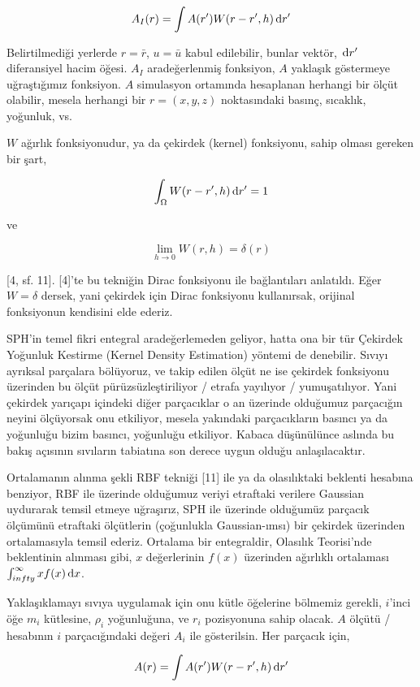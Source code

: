 \documentclass[12pt,fleqn]{article}\usepackage{../../common}
\begin{document}
$$
A_I(r) = \int A(r') W(r-r',h) \,\mathrm{d} r'
$$

Belirtilmediği yerlerde $r = \bar{r}$, $u = \bar{u}$ kabul edilebilir, bunlar
vektör, $\,\mathrm{d} r'$ diferansiyel hacim öğesi. $A_I$ aradeğerlenmiş fonksiyon, $A$
yaklaşık göstermeye uğraştığımız fonksiyon. $A$ simulasyon ortamında hesaplanan
herhangi bir ölçüt olabilir, mesela herhangi bir $r=(x,y,z)$ noktasındaki
basınç, sıcaklık, yoğunluk, vs.

$W$ ağırlık fonksiyonudur, ya da çekirdek (kernel) fonksiyonu, sahip olması
gereken bir şart,

$$
\int_\Omega  W(r-r',h) \,\mathrm{d} r' = 1
$$

ve

$$
\lim_{h \to 0} W(r,h) = \delta(r)
$$

[4, sf. 11]. [4]'te bu tekniğin Dirac fonksiyonu ile bağlantıları
anlatıldı. Eğer $W = \delta$ dersek, yani çekirdek için Dirac fonksiyonu
kullanırsak, orijinal fonksiyonun kendisini elde ederiz.

SPH'in temel fikri entegral aradeğerlemeden geliyor, hatta ona bir tür Çekirdek
Yoğunluk Kestirme (Kernel Density Estimation) yöntemi de denebilir. Sıvıyı
ayrıksal parçalara bölüyoruz, ve takip edilen ölçüt ne ise çekirdek fonksiyonu
üzerinden bu ölçüt pürüzsüzleştiriliyor / etrafa yayılıyor / yumuşatılıyor. Yani
çekirdek yarıçapı içindeki diğer parçacıklar o an üzerinde olduğumuz parçacığın
neyini ölçüyorsak onu etkiliyor, mesela yakındaki parçacıkların basıncı ya da
yoğunluğu bizim basıncı, yoğunluğu etkiliyor. Kabaca düşünülünce aslında bu
bakış açısının sıvıların tabiatına son derece uygun olduğu anlaşılacaktır.

Ortalamanın alınma şekli RBF tekniği [11] ile ya da olasılıktaki beklenti
hesabına benziyor, RBF ile üzerinde olduğumuz veriyi etraftaki verilere Gaussian
uydurarak temsil etmeye uğraşırız, SPH ile üzerinde olduğumüz parçacık ölçümünü
etraftaki ölçütlerin (çoğunlukla Gaussian-ımsı) bir çekirdek üzerinden
ortalamasıyla temsil ederiz. Ortalama bir entegraldir, Olasılık Teorisi'nde
beklentinin alınması gibi, $x$ değerlerinin $f(x)$ üzerinden ağırlıklı
ortalaması $\int_{\-infty}^{\infty} x f(x) \,\mathrm{d} x$.

Yaklaşıklamayı sıvıya uygulamak için onu kütle öğelerine bölmemiz gerekli,
$i$'inci öğe $m_i$ kütlesine, $\rho_i$ yoğunluğuna, ve $r_i$ pozisyonuna sahip
olacak. $A$ ölçütü / hesabının $i$ parçacığındaki değeri $A_i$ ile
gösterilsin. Her parçacık için,

$$
A(r) = \int A(r') W(r-r',h) \,\mathrm{d} r'
$$
\end{document}
